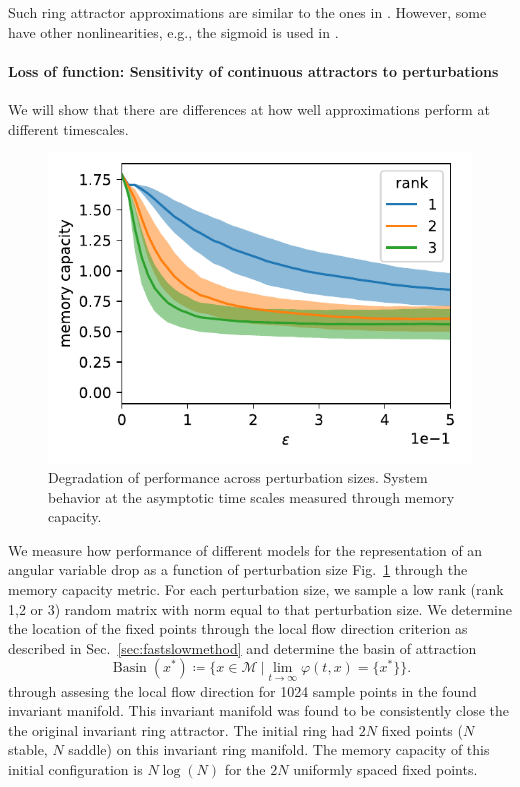 \documentclass{article} %
\newcounter{ct}
\newcommand{\manifold}{\mathcal{M}}
\DeclareMathOperator{\basin}{Basin}
\theoremstyle{definition}
\theoremstyle{remark}
\begin{document}
 Such ring attractor approximations are similar to the ones in \citep{goodridge2000, samsonovich1997path, redish1996coupled, tsodyks1995associative}. %
However, some have other nonlinearities, e.g.,  the sigmoid is used in \citep{goodridge2000}.


\paragraph{Loss of function: Sensitivity of continuous attractors to perturbations}\label{sec:supp:boa}
We will show that there are differences at how well approximations perform at different timescales.

\begin{figure}[tbhp]
  \centering
  \includegraphics[width=\textwidth]{performance2}
  \caption{Degradation of performance across perturbation sizes. System behavior at the asymptotic time scales measured through memory capacity. }\label{fig:performance}
\end{figure}



We measure how performance of different models for the representation of an angular variable drop as a function of perturbation size Fig.~\ref{fig:performance} through the memory capacity metric.
For each perturbation size, we sample a low rank (rank 1,2 or 3) random matrix with norm equal to that perturbation size.
We determine the location of the fixed points through the local flow direction criterion as described in Sec.~\ref{sec:fastslowmethod}
and determine the basin of attraction
\begin{equation}
\basin(x^*) \coloneqq \{x\in \manifold \ | \lim_{t\rightarrow\infty}\varphi(t,x)=\{x^*\}\}.
\end{equation}
through assesing the local flow direction for 1024 sample points in the found invariant manifold.
This invariant manifold was found to be consistently close the the original invariant ring attractor.
The initial ring had \(2N\) fixed points (\(N\) stable, \(N\) saddle) on this invariant ring manifold.
The memory capacity of this initial configuration is \(N\log(N)\) for the \(2N\) uniformly spaced fixed points.
\end{document}
